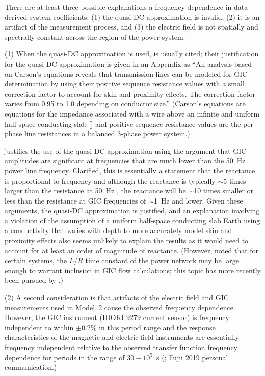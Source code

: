 \documentclass[draft,linenumbers]{agujournal2018}
\begin{document}
There are at least three possible explanations a frequency dependence in data-derived system coefficients: (1) the quasi-DC approximation is invalid, (2) it is an artifact of the measurement process, and (3) the electric field is not spatially and spectrally constant across the region of the power system.

(1) When the quasi-DC approximation is used, \cite{Albertson1981} is usually cited; their justification for the quasi-DC approximation is given in an Appendix as ``An analysis based on Carson's equations reveals that transmission lines can be modeled for GIC determination by using their positive sequence resistance values with a small correction factor to account for skin and proximity effects. The correction factor varies from 0.95 to 1.0 depending on conductor size.'' (Carson's equations are equations for the impedance associated with a wire above an infinite and uniform half-space conducting slab [\cite{Carson1926,Grigsby2007}] and positive sequence resistance values are the per phase line resistances in a balanced 3-phase power system.)

\cite{Lehtinen1985} justifies the use of the quasi-DC approximation using the argument that GIC amplitudes are significant at frequencies that are much lower than the 50~Hz power line frequency. Clarified, this is essentially a statement that the reactance is proportional to frequency and although the reactance is typically $\sim$5 times larger than the resistance at 50~Hz \citep{Purchala2005}, the reactance will be $\sim$10 times smaller or less than the resistance at GIC frequencies of $\sim$1~Hz and lower. Given these arguments, the quasi-DC approximation is justified, and an explanation involving a violation of the assumption of a uniform half-space conducting slab Earth using a conductivity that varies with depth to more accurately model skin and proximity effects also seems unlikely to explain the results as it would need to account for at least an order of magnitude of reactance. (However, \cite{Boteler1994} noted that for certain systems, the $L/R$ time constant of the power network may be large enough to warrant inclusion in GIC flow calculations; this topic has more recently been pursued by \cite{Oyedokun2013a}.)

(2) A second consideration is that artifacts of the electric field and GIC measurements used in Model~2 cause the observed frequency dependence. However, the GIC instrument (HIOKI 9279 current sensor) is frequency independent to within $\pm 0.2$\% in this period range and the response characteristics of the magnetic and electric field instruments are essentially frequency independent relative to the observed transfer function frequency dependence for periods in the range of $30-10^{5}$~s (\cite{Oowada1998}; Fujii 2019 personal communication.)
\end{document}
